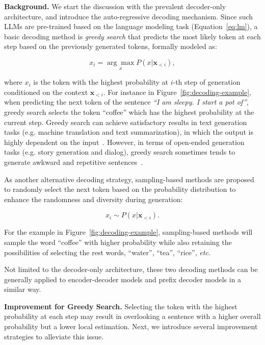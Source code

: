\textbf{Background.} We start the discussion with the prevalent decoder-only architecture, and introduce the auto-regressive decoding mechanism.  Since such LLMs are pre-trained based on the  language modeling task (Equation~\ref{eq:lm}), a basic decoding method is \emph{greedy search} that predicts the most likely token at each step based on the previously generated tokens, formally modeled as:

\begin{equation}
{ x_i = \underset{x}{\arg\max} P(x |\mathbf{x}_{<i}),}
\end{equation}

where $x_i$ is the token with the highest probability at $i$-th step of generation conditioned on the context $\mathbf{x}_{<i}$. For instance in Figure~\ref{fig:decoding-example}, when predicting the next token of the sentence \emph{``I am sleepy. I start a pot of''}, greedy search selects the token ``coffee'' which has the highest probability at the current step. Greedy search can achieve satisfactory results in  text generation tasks (e.g. machine translation and text summarization), in which  the output is highly dependent on the input~\cite{Murray-WMT-2018-Correcting}. However, in terms of open-ended generation tasks (e.g. story generation and dialog), greedy search sometimes tends to generate awkward and repetitive sentences~\cite{Holtzman-2020-ICLR-The}.

As another alternative decoding strategy, sampling-based methods are proposed to randomly select the next token based on the probability distribution to enhance the randomness and diversity during generation:

\begin{equation}
    x_i \sim P(x|\mathbf{x}_{<i}).
\end{equation}

 
For the example in  Figure~\ref{fig:decoding-example}, sampling-based methods will sample the word ``coffee'' with higher probability while also retaining the possibilities of selecting the rest words, ``water'', ``tea'', ``rice'', \emph{etc}.

Not limited to the decoder-only architecture, these two decoding methods can be generally applied to encoder-decoder models and prefix decoder models in a similar way.   

\textbf{Improvement for Greedy Search.} Selecting the token with the highest probability at each step may result in overlooking a sentence with a higher overall probability but a lower local estimation. Next, we introduce several improvement strategies  to alleviate this issue.

